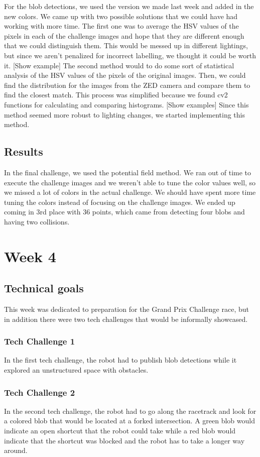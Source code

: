 \documentclass[journal, a4paper]{IEEEtran}
\begin{document}
For the blob detections, we used the version we made last week and added in the new colors. We came up with two possible solutions that we could have had working with more time. The first one was to average the HSV values of the pixels in each of the challenge images and hope that they are different enough that we could distinguish them. This would be messed up in different lightings, but since we aren’t penalized for incorrect labelling, we thought it could be worth it. [Show example] The second method would to do some sort of statistical analysis of the HSV values of the pixels of the original images. Then, we could find the distribution for the images from the ZED camera and compare them to find the closest match. This process was simplified because we found cv2 functions for calculating and comparing histograms. [Show examples] Since this method seemed more robust to lighting changes, we started implementing this method. 
\subsection{Results}
In the final challenge, we used the potential field method. We ran out of time to execute the challenge images and we weren’t able to tune the color values well, so we missed a lot of colors in the actual challenge. We should have spent more time tuning the colors instead of focusing on the challenge images. We ended up coming in 3rd place with 36 points, which came from detecting four blobs and having two collisions. 

\section{Week 4}
\subsection{Technical goals}
This week was dedicated to preparation for the Grand Prix Challenge race, but in addition there were two tech challenges that would be informally showcased. 
\subsubsection{Tech Challenge 1}
In the first tech challenge, the robot had to publish blob detections while it explored an unstructured space with obstacles.  
\subsubsection{Tech Challenge 2}
In the second tech challenge, the robot had to go along the racetrack and look for a colored blob that would be located at a forked intersection. A green blob would indicate an open shortcut that the robot could take while a red blob would indicate that the shortcut was blocked and the robot has to take a longer way around. \\ 
\end{document}
